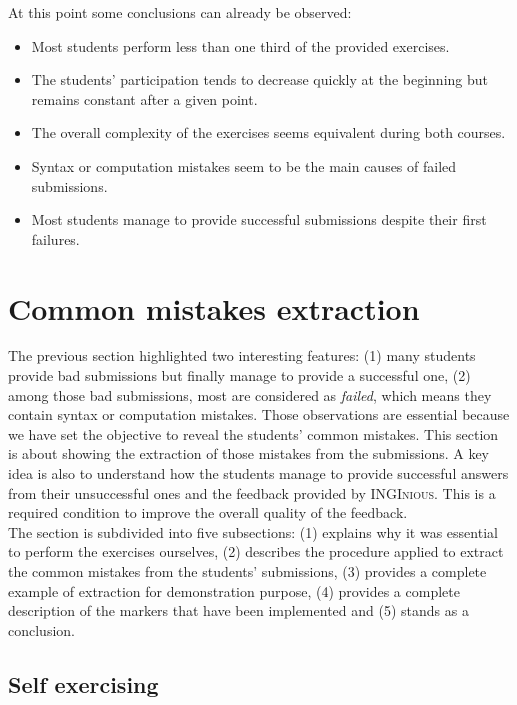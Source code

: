 \documentclass[11pt,a4paper,twoside,openright]{report}
\begin{document}
At this point some conclusions can already be observed:
\begin{itemize}
 \item Most students perform less than one third of the provided exercises.
 \item The students' participation tends to decrease quickly at the beginning 
 but remains constant after a given point.
 \item The overall complexity of the exercises seems equivalent during both 
courses.
 \item Syntax or computation mistakes seem to be the main causes of failed 
submissions.
 \item Most students manage to provide successful submissions despite their 
first failures.
\end{itemize}



\section{Common mistakes extraction}

The previous section highlighted two interesting features: (1) many students 
provide bad submissions but finally manage to provide a successful one, (2) 
among those bad submissions, most are considered as \textit{failed}, which means 
they contain syntax or computation mistakes. Those observations are essential 
because we have set the objective to reveal the students' common mistakes. This 
section is about showing the extraction of those mistakes from the submissions. 
A key idea is also to understand how the students manage to provide successful 
answers from their unsuccessful ones and the feedback provided by 
\textsc{INGInious}. This is a required condition to improve the overall quality 
of the feedback.\\

The section is subdivided into five subsections: (1) explains why it was 
essential to perform the exercises ourselves, (2) describes the procedure 
applied to extract the common mistakes from the students' submissions, (3) 
provides a complete example of extraction for demonstration purpose, (4) 
provides a complete description of the markers that have been implemented and 
(5) stands as a conclusion.\\

\subsection{Self exercising}
\end{document}
